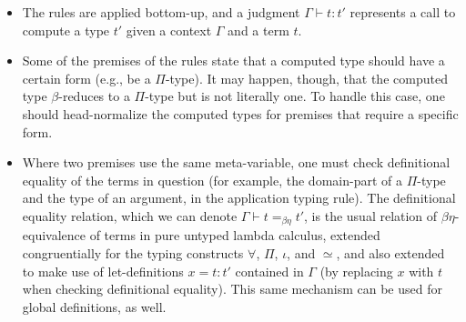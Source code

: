 \documentclass{article}
\begin{document}
\begin{itemize}
\item The rules are applied bottom-up, and a judgment $\Gamma\vdash t : t'$ represents a call to compute
  a type $t'$ given a context $\Gamma$ and a term $t$.
\item Some of the premises of the rules state that a computed type should have a certain form (e.g., be a $\Pi$-type).  It may happen, though, that the computed type $\beta$-reduces to a $\Pi$-type but is not literally one.  To handle this case, one should head-normalize the computed types for premises that require a specific form.
\item Where two premises use the same meta-variable, one must check definitional equality of the terms in question (for example, the domain-part of a $\Pi$-type and the type of an argument, in the application typing rule).
  The definitional equality relation, which we can denote $\Gamma \vdash t =_{\beta\eta} t'$,
  is the usual relation of $\beta\eta$-equivalence of
terms in pure untyped lambda calculus, extended congruentially for the
typing constructs $\forall$, $\Pi$, $\iota$, and $\simeq$, and also
extended to make use of let-definitions $x = t : t'$ contained in
$\Gamma$ (by replacing $x$ with $t$ when checking definitional
equality).  This same mechanism can be used for global definitions, as
well.
\end{itemize}
\end{document}
